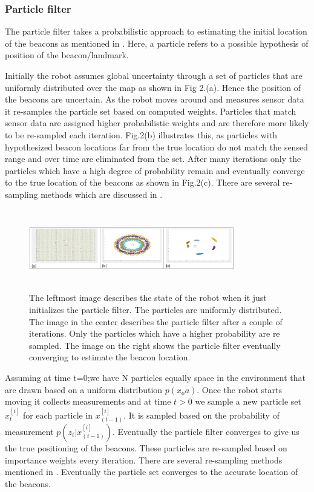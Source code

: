 \documentclass[conference]{IEEEtran}
\begin{document}
			\subsubsection{Particle filter}
				The particle filter takes a probabilistic approach to estimating the initial location of the beacons as mentioned in \cite{Thrun2002a}. Here, a particle refers to a  possible hypothesis of position of the beacon/landmark. 
				
				Initially the robot assumes global uncertainty through a set of particles that are uniformly distributed over the map as shown in Fig 2.(a). Hence the position of the beacons are uncertain. As the robot moves around and measures sensor data it re-samples the particle set based on computed weights. Particles that match sensor data are assigned higher probabilistic weights and are therefore more likely to be re-sampled each iteration. Fig.2(b) illustrates this, as particles with hypothesized beacon locations far from the true location do not match the sensed range and over time are eliminated from the set. After many iterations only the particles which have a high degree of probability  remain and eventually converge to the true location of the beacons as shown in Fig.2(c). There are several re-sampling methods which are discussed in \cite{Li2015}.
				\begin{figure}[h!]
					\centering
					\includegraphics[height=35mm,width=90mm]{Particle_filter_method.JPG}
					\caption{The leftmost image describes the state of the robot when it just initializes the particle filter. The particles are uniformly distributed. The image in the center describes the particle filter after a couple of iterations. Only the particles which have a higher probability are re sampled. The image on the right shows the particle filter eventually converging to estimate the beacon location. }
					
				\end{figure}
				Assuming at time t=0;we have N particles equally space in the environment that are drawn based on a uniform distribution $ p(x_oa)$.                                                                       
				Once the robot starts moving it collects measurements and at time $t>0$ we sample a new particle set $x^{[i]}_t$ for each particle in $x^{[i]}_{(t-1)}$. It is sampled based on the probability of measurement $p(z_t|x^{[i]}_{(t-1)})$. Eventually the particle filter converges to give us the true positioning of the beacons.
				 These particles are re-sampled based on importance weights every iteration. There are several re-sampling methods mentioned in \cite{Li2015}. Eventually the particle set converges to the accurate location of the beacons. 
				
\end{document}
